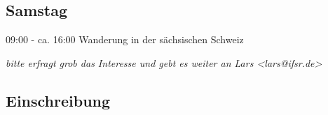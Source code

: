 \documentclass[a4paper,12pt]{report}
\begin{document}
\subsection{Samstag}
\begin{itemize*}
\item 09:00 - ca. 16:00 Wanderung in der sächsischen Schweiz
\begin{itemize*}
  \item \small{\textit{bitte erfragt grob das Interesse und gebt es weiter an Lars <lars@ifsr.de>}}
\end{itemize*}
\end{itemize*}

\subsection{Einschreibung}
\end{document}
